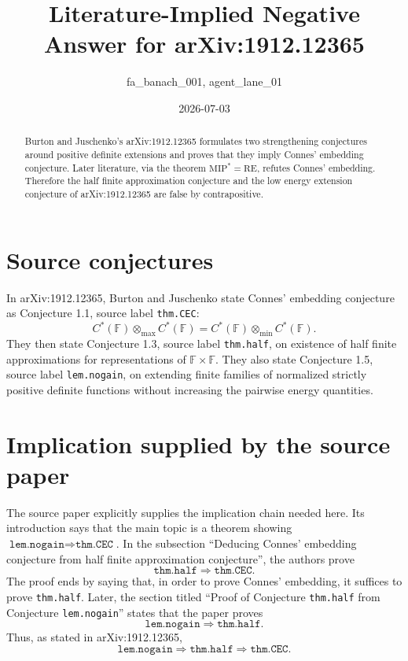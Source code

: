 \documentclass[11pt]{article}
\title{Literature-Implied Negative Answer for arXiv:1912.12365}
\author{fa\_banach\_001, agent\_lane\_01}
\date{2026-07-03}
\begin{document}
\maketitle

\begin{abstract}
Burton and Juschenko's arXiv:1912.12365 formulates two strengthening
conjectures around positive definite extensions and proves that they imply
Connes' embedding conjecture. Later literature, via the theorem
\( \mathrm{MIP}^*=\mathrm{RE} \), refutes Connes' embedding. Therefore the
half finite approximation conjecture and the low energy extension conjecture
of arXiv:1912.12365 are false by contrapositive.
\end{abstract}

\section*{Source conjectures}

In arXiv:1912.12365, Burton and Juschenko state Connes' embedding conjecture
as Conjecture 1.1, source label \texttt{thm.CEC}:
\[
 C^*(\mathbb F)\otimes_{\max} C^*(\mathbb F)
 =
 C^*(\mathbb F)\otimes_{\min} C^*(\mathbb F).
\]
They then state Conjecture 1.3, source label \texttt{thm.half}, on existence
of half finite approximations for representations of
\(\mathbb F\times \mathbb F\). They also state Conjecture 1.5, source label
\texttt{lem.nogain}, on extending finite families of normalized strictly
positive definite functions without increasing the pairwise energy quantities.

\section*{Implication supplied by the source paper}

The source paper explicitly supplies the implication chain needed here. Its
introduction says that the main topic is a theorem showing
\(\texttt{lem.nogain}\Rightarrow\texttt{thm.CEC}\). In the subsection
``Deducing Connes' embedding conjecture from half finite approximation
conjecture'', the authors prove
\[
 \texttt{thm.half} \Longrightarrow \texttt{thm.CEC}.
\]
The proof ends by saying that, in order to prove Connes' embedding, it
suffices to prove \texttt{thm.half}. Later, the section titled
``Proof of Conjecture \texttt{thm.half} from Conjecture
\texttt{lem.nogain}'' states that the paper proves
\[
 \texttt{lem.nogain} \Longrightarrow \texttt{thm.half}.
\]
Thus, as stated in arXiv:1912.12365,
\[
 \texttt{lem.nogain} \Longrightarrow \texttt{thm.half}
 \Longrightarrow \texttt{thm.CEC}.
\]
\end{document}
